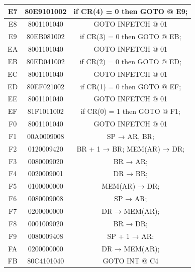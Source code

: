 \begin{center}
\begin{tabular}{|c|c|c|}
        E7    & 80E9101002   & if CR(4) = 0 then GOTO @ E9;          \\
        \hline
        E8    & 8001101040   & GOTO INFETCH @ 01                     \\
        \hline
        E9    & 80EB081002   & if CR(3) = 0 then GOTO @ EB;          \\
        \hline
        EA    & 8001101040   & GOTO INFETCH @ 01                     \\
        \hline
        EB    & 80ED041002   & if CR(2) = 0 then GOTO @ ED;          \\
        \hline
        EC    & 8001101040   & GOTO INFETCH @ 01                     \\
        \hline
        ED    & 80EF021002   & if CR(1) = 0 then GOTO @ EF;          \\
        \hline
        EE    & 8001101040   & GOTO INFETCH @ 01                     \\
        \hline
        EF    & 81F1011002   & if CR(0) = 1 then GOTO @ F1;          \\
        \hline
        F0    & 8001101040   & GOTO INFETCH @ 01                     \\
        \hline
        F1    & 00A0009008   & SP → AR, BR;                          \\
        \hline
        F2    & 0120009420   & BR + 1 → BR; MEM(AR) → DR;            \\
        \hline
        F3    & 0080009020   & BR → AR;                              \\
        \hline
        F4    & 0020009001   & DR → BR;                              \\
        \hline
        F5    & 0100000000   & MEM(AR) → DR;                         \\
        \hline
        F6    & 0080009008   & SP → AR;                              \\
        \hline
        F7    & 0200000000   & DR → MEM(AR);                         \\
        \hline
        F8    & 0001009020   & BR → DR;                              \\
        \hline
        F9    & 0080009408   & SP + 1 → AR;                          \\
        \hline
        FA    & 0200000000   & DR → MEM(AR);                         \\
        \hline
        FB    & 80C4101040   & GOTO INT @ C4                         \\
        \hline
    \end{tabular}
\end{center}


